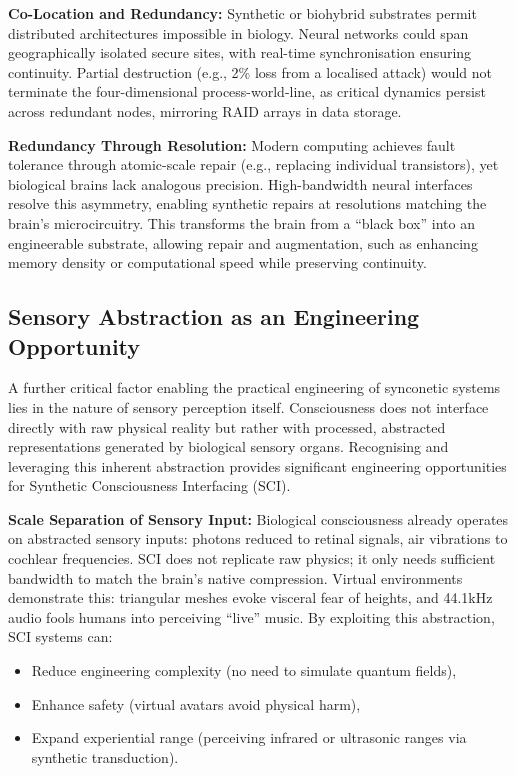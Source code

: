 \documentclass[10pt]{article}
\begin{document}
\begin{sloppypar}
  \textbf{Co-Location and Redundancy:} Synthetic or biohybrid substrates permit distributed architectures impossible in biology. Neural networks could span geographically isolated secure sites, with real-time synchronisation ensuring continuity. Partial destruction (e.g., 2\% loss from a localised attack) would not terminate the four-dimensional process-world-line, as critical dynamics persist across redundant nodes, mirroring RAID arrays in data storage.

  \textbf{Redundancy Through Resolution:} Modern computing achieves fault tolerance through atomic-scale repair (e.g., replacing individual transistors), yet biological brains lack analogous precision. High-bandwidth neural interfaces resolve this asymmetry, enabling synthetic repairs at resolutions matching the brain’s microcircuitry. This transforms the brain from a “black box” into an engineerable substrate, allowing repair and augmentation, such as enhancing memory density or computational speed while preserving continuity.

  \subsection{Sensory Abstraction as an Engineering Opportunity}
  \label{sec:sensory-abstraction}

  A further critical factor enabling the practical engineering of synconetic systems lies in the nature of sensory perception itself. Consciousness does not interface directly with raw physical reality but rather with processed, abstracted representations generated by biological sensory organs. Recognising and leveraging this inherent abstraction provides significant engineering opportunities for Synthetic Consciousness Interfacing (SCI).

  \textbf{Scale Separation of Sensory Input:} Biological consciousness already operates on abstracted sensory inputs: photons reduced to retinal signals, air vibrations to cochlear frequencies. SCI does not replicate raw physics; it only needs sufficient bandwidth to match the brain’s native compression. Virtual environments demonstrate this: triangular meshes evoke visceral fear of heights, and 44.1kHz audio fools humans into perceiving “live” music. By exploiting this abstraction, SCI systems can:

  \begin{itemize}
    \item Reduce engineering complexity (no need to simulate quantum fields),
    \item Enhance safety (virtual avatars avoid physical harm),
    \item Expand experiential range (perceiving infrared or ultrasonic ranges via synthetic transduction).
  \end{itemize}


\end{sloppypar}
\end{document}
